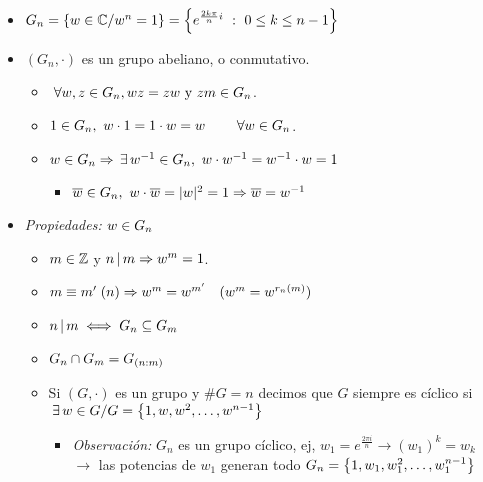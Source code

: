 \documentclass[12pt,a4paper, spanish]{article}
\begin{document}
\begin{itemize}
	\item $G_n = \left\{ w \in \mathbb C / w^n = 1 \right\} = \left\{ e^{\frac{2k \pi}{n} i}\ :\ 0\leq k \leq n-1 \right\}$

	\item $(G_n, \cdot)$ es un grupo abeliano, o conmutativo.
	      \begin{itemize}
		      \item $\;\forall w, z \in G_n, w z = z  w \text{ y } z m \in G_n$.

		      \item $1 \in G_n,\ w \cdot 1 = 1 \cdot w = w \qquad \;\forall w \in G_n$.

		      \item $w \in G_n \Rightarrow \,\exists\, w^{-1} \in G_n,\ w \cdot w^{-1} = w^{-1}\cdot w = 1$
		            \begin{itemize}
			            \item $\overline w \in G_n,\ w \cdot \overline w = |w|^2 = 1 \Rightarrow \overline w = w^{-1}$
		            \end{itemize}
	      \end{itemize}
	\item \textit{Propiedades: $w \in G_n$}
	      \begin{itemize}
		      \item $m \in \mathbb Z$ y $n \, | \, m \Rightarrow w^m = 1$.

		      \item $m \equiv m' \;(n) \Rightarrow w^m = w^{m'}\quad (w^m = w^{r_n(m)})$

		      \item $n \, | \, m \iff G_n \subseteq G_m$

		      \item $G_n \cap G_m = G_{(n:m)}$

		      \item Si $(G, \cdot)$ es un grupo y $\#G = n$ decimos que $G$ siempre es cíclico si
		            $\,\exists\, w\in G / G = \left\{ 1,w, w^2,\dots, w^{n-1} \right\}$\\
		            \begin{itemize}
			            \item \textit{Observación: } $G_n$ es un grupo cíclico, ej, $w_1 = e^\frac{2\pi i}{n} \to (w_1)^k = w_k$\\
			                  $\to$ las potencias de $w_1$ generan todo $G_n = \left\{ 1, w_1, w_1^2,\dots,w_1^{n-1} \right\}$
		            \end{itemize}


\end{itemize}
\end{itemize}
\end{document}
